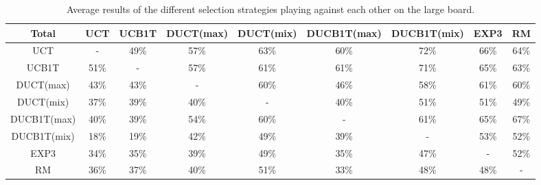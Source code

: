 \documentclass{article}
\begin{document}
\begin{table}[h!]\scriptsize
\centering
\begin{tabular}{|c||c|c|c|c|c|c|c|c|}
									\hline
  Total 		& UCT 	& UCB1T		& DUCT(max)	& DUCT(mix)	& DUCB1T(max)	& DUCB1T(mix)	& EXP3	& RM				\\ 	\hline\hline
  UCT 			&  -	& 49\%		& 57\%		& 63\%		& 60\%		& 72\%		& 66\%	& 64\%				\\ 	\hline
  UCB1T 		& 51\% 	& - 		& 57\%		& 61\%		& 61\%		& 71\%		& 65\%	& 63\%				\\ 	\hline
  DUCT(max) 		& 43\% 	& 43\% 		& -		& 60\%		& 46\%		& 58\%		& 61\%	& 60\%				\\ 	\hline
  DUCT(mix) 		& 37\% 	& 39\% 		& 40\%		& -		& 40\%		& 51\%		& 51\%	& 49\%				\\ 	\hline
  DUCB1T(max)	 	& 40\% 	& 39\% 		& 54\%		& 60\%		& -		& 61\%		& 65\%	& 67\%				\\ 	\hline
  DUCB1T(mix)	 	& 18\% 	& 19\% 		& 42\%		& 49\%		& 39\%		& -		& 53\%	& 52\%				\\ 	\hline
  EXP3 			& 34\%	& 35\% 		& 39\%		& 49\%		& 35\%		& 47\%		& -	& 52\%				\\ 	\hline
  RM		 	& 36\% 	& 37\%		& 40\%		& 51\%		& 33\%		& 48\%		& 48\%	& -				\\ 	\hline
\end{tabular}
\caption{Average results of the different selection strategies playing against each other on the large board.}
\label{table:round_robin_total}
\end{table}
\end{document}
